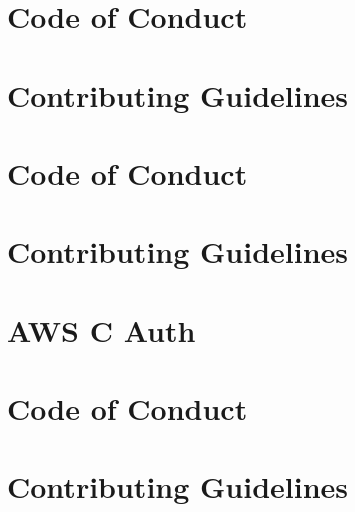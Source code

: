 \documentclass[twoside]{book}
\newcommand{\+}{\discretionary{\mbox{\scriptsize$\hookleftarrow$}}{}{}}
\begin{document}
\chapter{Code of Conduct}
\label{md_crt_aws_crt_cpp__c_o_d_e__o_f__c_o_n_d_u_c_t}

\chapter{Contributing Guidelines}
\label{md_crt_aws_crt_cpp__c_o_n_t_r_i_b_u_t_i_n_g}

\chapter{Code of Conduct}
\label{md_crt_aws_crt_cpp_crt_aws_c_auth__c_o_d_e__o_f__c_o_n_d_u_c_t}

\chapter{Contributing Guidelines}
\label{md_crt_aws_crt_cpp_crt_aws_c_auth__c_o_n_t_r_i_b_u_t_i_n_g}

\chapter{AWS C Auth}
\label{md_crt_aws_crt_cpp_crt_aws_c_auth__r_e_a_d_m_e}

\chapter{Code of Conduct}
\label{md_crt_aws_crt_cpp_crt_aws_c_cal__c_o_d_e__o_f__c_o_n_d_u_c_t}

\chapter{Contributing Guidelines}
\label{md_crt_aws_crt_cpp_crt_aws_c_cal__c_o_n_t_r_i_b_u_t_i_n_g}

\end{document}
